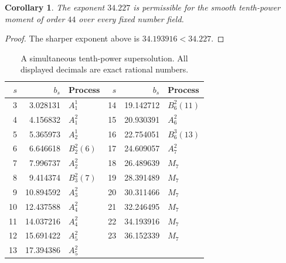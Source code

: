 \documentclass[11pt]{amsart}
\newtheorem{corollary}[theorem]{Corollary}
\theoremstyle{definition}
\numberwithin{equation}{section}
\begin{document}
\begin{corollary}\label{prop:tenth44}
The exponent $34.227$ is permissible for the smooth tenth-power moment
of order $44$ over every fixed number field.
\end{corollary}
\begin{proof}
The sharper exponent above is $34.193916<34.227$.
\end{proof}

\begin{table}[htbp]
\centering\small
\begin{tabular}{r r l@{\qquad}r r l}
\hline
$s$ & $b_s$ & Process & $s$ & $b_s$ & Process\\
\hline
3 & 3.028131 & $A_{1}^{1}$ & 14 & 19.142712 & $B_{6}^{2}(11)$\\
4 & 4.156832 & $A_{1}^{2}$ & 15 & 20.930391 & $A_{6}^{2}$\\
5 & 5.365973 & $A_{2}^{1}$ & 16 & 22.754051 & $B_{6}^{3}(13)$\\
6 & 6.646618 & $B_{2}^{2}(6)$ & 17 & 24.609057 & $A_{7}^{2}$\\
7 & 7.996737 & $A_{2}^{2}$ & 18 & 26.489639 & $M_7$\\
8 & 9.414374 & $B_{3}^{2}(7)$ & 19 & 28.391489 & $M_7$\\
9 & 10.894592 & $A_{3}^{2}$ & 20 & 30.311466 & $M_7$\\
10 & 12.437588 & $A_{4}^{2}$ & 21 & 32.246495 & $M_7$\\
11 & 14.037216 & $A_{4}^{2}$ & 22 & 34.193916 & $M_7$\\
12 & 15.691422 & $A_{5}^{2}$ & 23 & 36.152339 & $M_7$\\
13 & 17.394386 & $A_{5}^{2}$ &  & & \\
\hline
\end{tabular}
\caption{A simultaneous tenth-power supersolution. All displayed
 decimals are exact rational numbers.}\label{tab:tenth-seeds}
\end{table}
\end{document}
